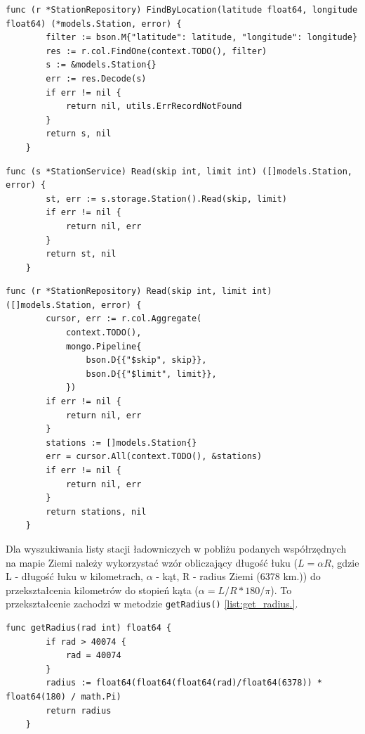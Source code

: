 \begin{lstlisting}[label=list:repo_read_station_FindByLocation,caption=Wyszukiwanie stacji ładowniczych w bazie danych współrzędnych pozycji na mapie Ziemi,basicstyle=\tiny\ttfamily]
    func (r *StationRepository) FindByLocation(latitude float64, longitude float64) (*models.Station, error) {
        filter := bson.M{"latitude": latitude, "longitude": longitude}
        res := r.col.FindOne(context.TODO(), filter)
        s := &models.Station{}
        err := res.Decode(s)
        if err != nil {
            return nil, utils.ErrRecordNotFound
        }
        return s, nil
    }
\end{lstlisting}
\begin{lstlisting}[label=list:service_read_station_Read,caption=Serwis wczytania listy kolejnych stacji ładowniczych,basicstyle=\tiny\ttfamily]
    func (s *StationService) Read(skip int, limit int) ([]models.Station, error) {
        st, err := s.storage.Station().Read(skip, limit)
        if err != nil {
            return nil, err
        }
        return st, nil
    }
\end{lstlisting}
\begin{lstlisting}[label=list:repo_read_station_Read,caption=Wczytanie listy kolejnych stacji ładowniczych z bazy danych,basicstyle=\tiny\ttfamily]
    func (r *StationRepository) Read(skip int, limit int) ([]models.Station, error) {
        cursor, err := r.col.Aggregate(
            context.TODO(),
            mongo.Pipeline{
                bson.D{{"$skip", skip}},
                bson.D{{"$limit", limit}},
            })
        if err != nil {
            return nil, err
        }
        stations := []models.Station{}
        err = cursor.All(context.TODO(), &stations)
        if err != nil {
            return nil, err
        }
        return stations, nil
    }
\end{lstlisting}

Dla wyszukiwania listy stacji ładowniczych w pobliżu podanych współrzędnych na mapie Ziemi należy wykorzystać wzór obliczający długość łuku (${L = \alpha R}$, gdzie L - długość łuku w kilometrach, ${\alpha}$ - kąt, R - radius Ziemi (6378 km.)) do przekształcenia kilometrów do stopień kąta (${\alpha = L/R*180/\pi}$). To przekształcenie zachodzi w metodzie \texttt{getRadius()} \ref{list:get_radius.}.
\begin{lstlisting}[label=list:get_radius,caption=Obliczenie dystansu przeszukiwania,basicstyle=\tiny\ttfamily]
    func getRadius(rad int) float64 {
        if rad > 40074 {
            rad = 40074
        }
        radius := float64(float64(float64(rad)/float64(6378)) * float64(180) / math.Pi)
        return radius
    }
\end{lstlisting}

